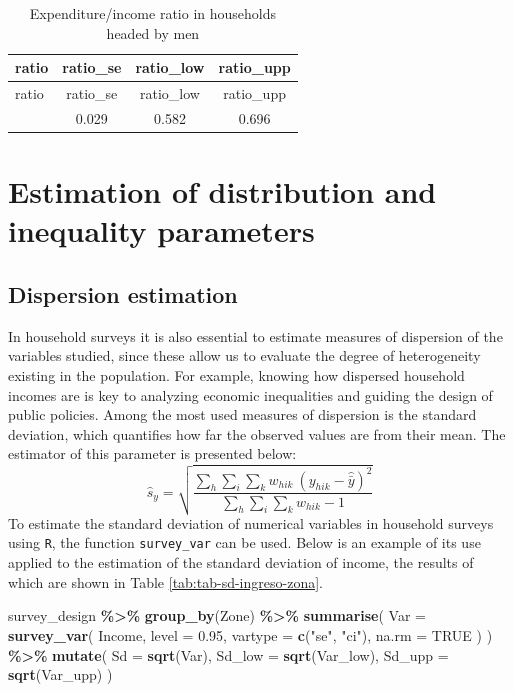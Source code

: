 \documentclass[
  english,
  12pt,
]{book}
\newenvironment{Shaded}{\begin{snugshade}}{\end{snugshade}}
\newcommand{\AttributeTok}[1]{\textcolor[rgb]{0.13,0.29,0.53}{#1}}
\newcommand{\ConstantTok}[1]{\textcolor[rgb]{0.56,0.35,0.01}{#1}}
\newcommand{\FloatTok}[1]{\textcolor[rgb]{0.00,0.00,0.81}{#1}}
\newcommand{\FunctionTok}[1]{\textcolor[rgb]{0.13,0.29,0.53}{\textbf{#1}}}
\newcommand{\NormalTok}[1]{#1}
\newcommand{\SpecialCharTok}[1]{\textcolor[rgb]{0.81,0.36,0.00}{\textbf{#1}}}
\newcommand{\StringTok}[1]{\textcolor[rgb]{0.31,0.60,0.02}{#1}}
\begin{document}
\begin{longtable}[]{@{}lccc@{}}
\caption{\label{tab:tab-razon-gasto-ingreso-hombre}Expenditure/income ratio in households headed by men}\tabularnewline
\toprule\noalign{}
ratio & ratio\_se & ratio\_low & ratio\_upp \\
\midrule\noalign{}
\endfirsthead
\toprule\noalign{}
ratio & ratio\_se & ratio\_low & ratio\_upp \\
\midrule\noalign{}
\endhead
\bottomrule\noalign{}
\endlastfoot
0.639 & 0.029 & 0.582 & 0.696 \\
\end{longtable}

\section{Estimation of distribution and inequality parameters}\label{estimacion-de-parametros-de-distribucion-y-desigualdad}

\subsection{Dispersion estimation}\label{estimacion-de-la-dispersion}

In household surveys it is also essential to estimate measures of dispersion of the variables studied, since these allow us to evaluate the degree of heterogeneity existing in the population. For example, knowing how dispersed household incomes are is key to analyzing economic inequalities and guiding the design of public policies. Among the most used measures of dispersion is the standard deviation, which quantifies how far the observed values are from their mean. The estimator of this parameter is presented below:
\[
\hat s_y  =  \sqrt{\frac{\sum_{h}\sum_{i}\sum_{k} w_{hik} \ \left(y_{hik}-\hat{\bar{y}}\right)^{2}}{\sum_{h}\sum_{i}\sum_{k} w_{hik}-1}}
\]
To estimate the standard deviation of numerical variables in household surveys using \texttt{R}, the function \texttt{survey\_var} can be used. Below is an example of its use applied to the estimation of the standard deviation of income, the results of which are shown in Table \ref{tab:tab-sd-ingreso-zona}.

\begin{Shaded}
\begin{Highlighting}[]
\NormalTok{survey\_design }\SpecialCharTok{\%\textgreater{}\%}
  \FunctionTok{group\_by}\NormalTok{(Zone) }\SpecialCharTok{\%\textgreater{}\%}
  \FunctionTok{summarise}\NormalTok{(}
    \AttributeTok{Var =} \FunctionTok{survey\_var}\NormalTok{(}
\NormalTok{      Income,}
      \AttributeTok{level =} \FloatTok{0.95}\NormalTok{,}
      \AttributeTok{vartype =} \FunctionTok{c}\NormalTok{(}\StringTok{"se"}\NormalTok{, }\StringTok{"ci"}\NormalTok{),}
      \AttributeTok{na.rm =} \ConstantTok{TRUE}
\NormalTok{    )}
\NormalTok{  ) }\SpecialCharTok{\%\textgreater{}\%}
  \FunctionTok{mutate}\NormalTok{(}
    \AttributeTok{Sd     =} \FunctionTok{sqrt}\NormalTok{(Var),}
    \AttributeTok{Sd\_low =} \FunctionTok{sqrt}\NormalTok{(Var\_low),}
    \AttributeTok{Sd\_upp =} \FunctionTok{sqrt}\NormalTok{(Var\_upp)}
\NormalTok{  )}
\end{Highlighting}
\end{Shaded}
\end{document}
